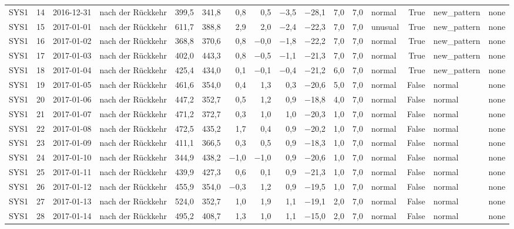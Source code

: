 \begin{tabular}{lrllrrrrrrrrlrll}
SYS1 & 14 & 2016-12-31 & nach der Rückkehr & 399,5 & 341,8 & 0,8 & 0,5 & $-$3,5 & $-$28,1 & 7,0 & 7,0 & normal & True & new\_pattern & none \\
SYS1 & 15 & 2017-01-01 & nach der Rückkehr & 611,7 & 388,8 & 2,9 & 2,0 & $-$2,4 & $-$22,3 & 7,0 & 7,0 & unusual & True & new\_pattern & none \\
SYS1 & 16 & 2017-01-02 & nach der Rückkehr & 368,8 & 370,6 & 0,8 & $-$0,0 & $-$1,8 & $-$22,2 & 7,0 & 7,0 & normal & True & new\_pattern & none \\
SYS1 & 17 & 2017-01-03 & nach der Rückkehr & 402,0 & 443,3 & 0,8 & $-$0,5 & $-$1,1 & $-$21,3 & 7,0 & 7,0 & normal & True & new\_pattern & none \\
SYS1 & 18 & 2017-01-04 & nach der Rückkehr & 425,4 & 434,0 & 0,1 & $-$0,1 & $-$0,4 & $-$21,2 & 6,0 & 7,0 & normal & True & new\_pattern & none \\
SYS1 & 19 & 2017-01-05 & nach der Rückkehr & 461,6 & 354,0 & 0,4 & 1,3 & 0,3 & $-$20,6 & 5,0 & 7,0 & normal & False & normal & none \\
SYS1 & 20 & 2017-01-06 & nach der Rückkehr & 447,2 & 352,7 & 0,5 & 1,2 & 0,9 & $-$18,8 & 4,0 & 7,0 & normal & False & normal & none \\
SYS1 & 21 & 2017-01-07 & nach der Rückkehr & 471,2 & 372,7 & 0,3 & 1,0 & 1,0 & $-$20,3 & 1,0 & 7,0 & normal & False & normal & none \\
SYS1 & 22 & 2017-01-08 & nach der Rückkehr & 472,5 & 435,2 & 1,7 & 0,4 & 0,9 & $-$20,2 & 1,0 & 7,0 & normal & False & normal & none \\
SYS1 & 23 & 2017-01-09 & nach der Rückkehr & 411,1 & 366,5 & 0,3 & 0,5 & 0,9 & $-$18,3 & 1,0 & 7,0 & normal & False & normal & none \\
SYS1 & 24 & 2017-01-10 & nach der Rückkehr & 344,9 & 438,2 & $-$1,0 & $-$1,0 & 0,9 & $-$20,6 & 1,0 & 7,0 & normal & False & normal & none \\
SYS1 & 25 & 2017-01-11 & nach der Rückkehr & 439,9 & 427,3 & 0,6 & 0,1 & 0,9 & $-$21,3 & 1,0 & 7,0 & normal & False & normal & none \\
SYS1 & 26 & 2017-01-12 & nach der Rückkehr & 455,9 & 354,0 & $-$0,3 & 1,2 & 0,9 & $-$19,5 & 1,0 & 7,0 & normal & False & normal & none \\
SYS1 & 27 & 2017-01-13 & nach der Rückkehr & 524,0 & 352,7 & 1,0 & 1,9 & 1,1 & $-$19,1 & 2,0 & 7,0 & normal & False & normal & none \\
SYS1 & 28 & 2017-01-14 & nach der Rückkehr & 495,2 & 408,7 & 1,3 & 1,0 & 1,1 & $-$15,0 & 2,0 & 7,0 & normal & False & normal & none \\

\end{tabular}
